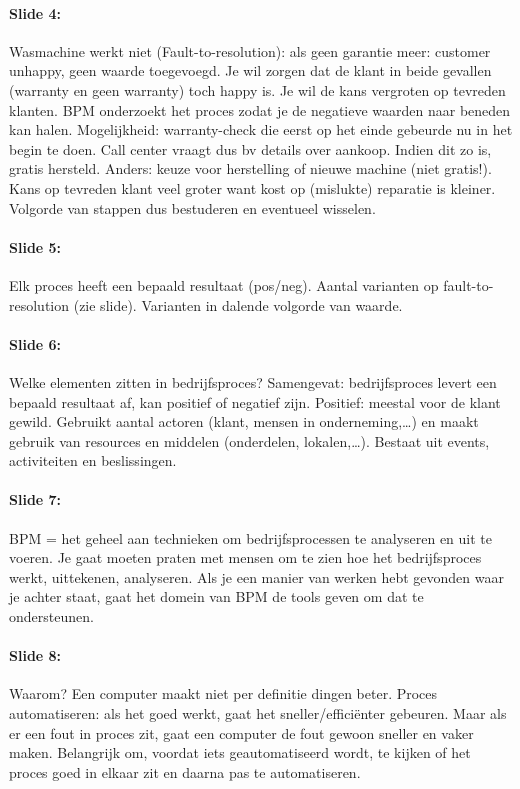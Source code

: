 \documentclass[10pt,a4paper]{report}
\begin{document}
\paragraph{Slide 4:}Wasmachine werkt niet (Fault-to-resolution): als geen garantie meer: customer unhappy, geen waarde toegevoegd. Je wil zorgen dat de klant in beide gevallen (warranty en geen warranty) toch happy is. Je wil de kans vergroten op tevreden klanten. BPM onderzoekt het proces zodat je de negatieve waarden naar beneden kan halen. Mogelijkheid: warranty-check die eerst op het einde gebeurde nu in het begin te doen. Call center vraagt dus bv details over aankoop. Indien dit zo is, gratis hersteld. Anders: keuze voor herstelling of nieuwe machine (niet gratis!). Kans op tevreden klant veel groter want kost op (mislukte) reparatie is kleiner. Volgorde van stappen dus bestuderen en eventueel wisselen.

\paragraph{Slide 5:}Elk proces heeft een bepaald resultaat (pos/neg). Aantal varianten op fault-to-resolution (zie slide). Varianten in dalende volgorde van waarde.

\paragraph{Slide 6:}Welke elementen zitten in bedrijfsproces? Samengevat: bedrijfsproces levert een bepaald resultaat af, kan positief of negatief zijn. Positief: meestal voor de klant gewild. Gebruikt aantal actoren (klant, mensen in onderneming,…) en maakt gebruik van resources en middelen (onderdelen, lokalen,…). Bestaat uit events, activiteiten en beslissingen.

\paragraph{Slide 7:}BPM = het geheel aan technieken om bedrijfsprocessen te analyseren en uit te voeren. Je gaat moeten praten met mensen om te zien hoe het bedrijfsproces werkt, uittekenen, analyseren. Als je een manier van werken hebt gevonden waar je achter staat, gaat het domein van BPM de tools geven om dat te ondersteunen.

\paragraph{Slide 8:}Waarom? Een computer maakt niet per definitie dingen beter. Proces automatiseren: als het goed werkt, gaat het sneller/efficiënter gebeuren. Maar als er een fout in proces zit, gaat een computer de fout gewoon sneller en vaker maken. Belangrijk om, voordat iets geautomatiseerd wordt, te kijken of het proces goed in elkaar zit en daarna pas te automatiseren.
\end{document}
